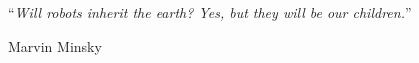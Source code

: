 \chapter*{}

\vspace*{0.2\textheight}

\hfill\noindent\enquote{\itshape Will robots inherit the earth? Yes, but they will be our children.}\bigbreak

\hfill Marvin Minsky


